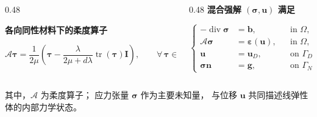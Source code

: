 \documentclass[notheorems]{beamer}
\begin{document}
\begin{frame}
{\begin{tcolorbox}
{\begin{columns}[T, totalwidth=\linewidth]
\begin{column}{0.48\linewidth}
							\vspace{-0.15em}
							
							{\fontsize{7.6}{9.6}\selectfont\bfseries\sffamily
								各向同性材料下的柔度算子}
							
							\vspace{-1.5em}
							
							\[
							\mathcal{A}\boldsymbol{\tau}
							=
							\frac{1}{2\mu}
							\left(
							\boldsymbol{\tau}
							-
							\frac{\lambda}{2\mu+d\lambda}
							\operatorname{tr}(\boldsymbol{\tau})\boldsymbol{I}
							\right),
							\qquad
							\forall\,\boldsymbol{\tau}\in\mathbb{S}.
							\]
						\end{column}
						
						\begin{column}{0.48\linewidth}
							\centering
							{\fontsize{7.6}{9.6}\selectfont\bfseries\sffamily
								混合强解 $(\boldsymbol{\sigma},\boldsymbol{u})$ 满足}
							
							\vspace{-1.5em}
							
							\[
							\left\{
							\begin{aligned}
								-\operatorname{div}\boldsymbol{\sigma}
								&=
								\boldsymbol{b},
								&& \text{in } \Omega,
								\\[3pt]
								\mathcal{A}\boldsymbol{\sigma}
								&=
								\boldsymbol{\varepsilon}(\boldsymbol{u}),
								&& \text{in } \Omega,
								\\[3pt]
								\boldsymbol{u}
								&=
								\boldsymbol{u}_{D},
								&& \text{on } \Gamma_D,
								\\[3pt]
								\boldsymbol{\sigma}\boldsymbol{n}
								&=
								\boldsymbol{g},
								&& \text{on } \Gamma_N .
							\end{aligned}
							\right.
							\]
						\end{column}
						
					\end{columns}
					
					\vspace{1.0em}
					
					{\fontsize{7.15}{9.6}\selectfont
						其中，$\mathcal{A}$ 为柔度算子；
						应力张量 $\boldsymbol{\sigma}$ 作为主要未知量，
						与位移 $\boldsymbol{u}$ 共同描述线弹性体的内部力学状态。}
				}
			\end{tcolorbox}
			
}
\end{frame}
\end{document}
